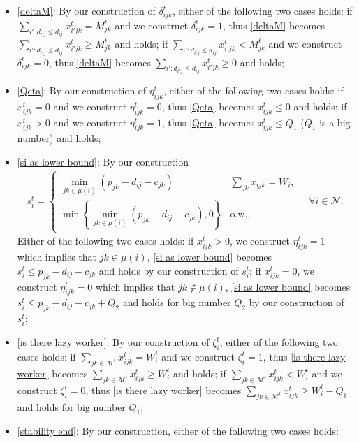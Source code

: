 \documentclass[trsc,nonblindrev]{informs3noheader}
\begin{document}
\begin{itemize}
    \item \eqref{deltaM}: By our construction of $\delta_{ijk}^t$, either of the following two cases holds: 
    if $\sum_{i':d_{i'j}\le d_{ij}} x^t_{i'jk} = M_{jk}^t$ and we construct $\delta_{ijk}^t=1$, thus \eqref{deltaM} becomes $\sum_{i':d_{i'j}\le d_{ij}} x^t_{i'jk} \geq M_{jk}^t$ and holds; 
    if $\sum_{i':d_{i'j}\le d_{ij}} x^t_{i'jk} < M_{jk}^t$ and we construct $\delta_{ijk}^t=0$, thus \eqref{deltaM} becomes $\sum_{i':d_{i'j}\le d_{ij}} x^t_{i'jk} \geq 0$ and holds;
    \item \eqref{Qeta}: By our construction of $\eta_{ijk}^t$, either of the following two cases holds: 
    if $x_{ijk}^t=0$ and we construct $\eta_{ijk}^t=0$, thus \eqref{Qeta} becomes $x_{ijk}^t\leq 0$ and holds; 
    if $x_{ijk}^t>0$ and we construct $\eta_{ijk}^t=1$, thus \eqref{Qeta} becomes $x_{ijk}^t \leq Q_1$ ($Q_1$ is a big number) and holds;
    \item \eqref{si as lower bound}: By our construction
    \begin{align*}
        s_i^t = \begin{cases}
    \min_{jk\in \mu(i)} \left(p_{jk}-d_{ij}-c_{jk}\right) & \sum_{jk}x_{ijk} = W_i,\\
    \min \left\{\min_{jk\in \mu(i)} \left(p_{jk}-d_{ij}-c_{jk}\right),0\right\} & \text{o.w.},
    \end{cases}
    \quad \forall i\in \mathcal{N}.
    \end{align*} Either of the following two cases holds: 
    if $x_{ijk}^t >0$, we construct $\eta_{ijk}^t=1$ which implies that $jk\in \mu(i)$, \eqref{si as lower bound} becomes $s_i^t\leq p_{jk}-d_{ij}-c_{jk}$ and holds by our construction of $s_i^t$; 
    if $x_{ijk}^t =0$, we construct $\eta_{ijk}^t=0$ which implies that $jk\notin \mu(i)$, \eqref{si as lower bound} becomes $s_i^t\leq p_{jk}-d_{ij}-c_{jk} + Q_2$ and holds for big number $Q_2$ by our construction of $s_i^t$;
    \item \eqref{is there lazy worker}: By our construction of $\zeta_{i}^t$, either of the following two cases holds: 
    if $\sum_{jk\in\mathcal{M}^t} x_{ijk}^t=W_i^t$ and we construct $\zeta_{i}^t=1$, thus \eqref{is there lazy worker} becomes $\sum_{jk\in\mathcal{M}^t}x_{ijk}^t\geq W_i^t$ and holds;
    if $\sum_{jk\in\mathcal{M}^t} x_{ijk}^t<W_i^t$ and we construct $\zeta_{i}^t=0$, thus \eqref{is there lazy worker} becomes $\sum_{jk\in\mathcal{M}^t}x_{ijk}^t\geq W_i^t - Q_1$ and holds for big number $Q_1$;
    \item \eqref{stability end}: By our construction, either of the following two cases holds: 

\end{itemize}
\end{document}
